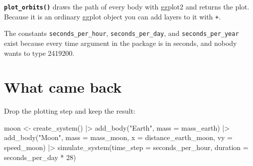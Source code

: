 \documentclass[
  10.5pt,
  letterpaper,
]{scrbook}
\newenvironment{Shaded}{\begin{snugshade}}{\end{snugshade}}
\newcommand{\AttributeTok}[1]{\textcolor[rgb]{0.00,0.00,0.00}{#1}}
\newcommand{\DecValTok}[1]{\textcolor[rgb]{0.00,0.00,0.00}{#1}}
\newcommand{\FunctionTok}[1]{\textcolor[rgb]{0.00,0.00,0.00}{#1}}
\newcommand{\NormalTok}[1]{\textcolor[rgb]{0.00,0.00,0.00}{#1}}
\newcommand{\OtherTok}[1]{\textcolor[rgb]{0.00,0.00,0.00}{#1}}
\newcommand{\SpecialCharTok}[1]{\textcolor[rgb]{0.00,0.00,0.00}{#1}}
\newcommand{\StringTok}[1]{\textcolor[rgb]{0.00,0.00,0.00}{#1}}
\theoremstyle{definition}
\theoremstyle{plain}
\theoremstyle{remark}
\begin{document}
\textbf{\texttt{plot\_orbits()}} draws the path of every body with
ggplot2 and returns the plot. Because it is an ordinary ggplot object
you can add layers to it with \texttt{+}.

The constants \texttt{seconds\_per\_hour}, \texttt{seconds\_per\_day},
and \texttt{seconds\_per\_year} exist because every time argument in the
package is in seconds, and nobody wants to type 2419200.

\section{What came back}\label{what-came-back}

Drop the plotting step and keep the result:

\begin{Shaded}
\begin{Highlighting}[]
\NormalTok{moon }\OtherTok{\textless{}{-}} \FunctionTok{create\_system}\NormalTok{() }\SpecialCharTok{|\textgreater{}}
  \FunctionTok{add\_body}\NormalTok{(}\StringTok{"Earth"}\NormalTok{, }\AttributeTok{mass =}\NormalTok{ mass\_earth) }\SpecialCharTok{|\textgreater{}}
  \FunctionTok{add\_body}\NormalTok{(}\StringTok{"Moon"}\NormalTok{, }\AttributeTok{mass =}\NormalTok{ mass\_moon, }\AttributeTok{x =}\NormalTok{ distance\_earth\_moon, }\AttributeTok{vy =}\NormalTok{ speed\_moon) }\SpecialCharTok{|\textgreater{}}
  \FunctionTok{simulate\_system}\NormalTok{(}\AttributeTok{time\_step =}\NormalTok{ seconds\_per\_hour, }\AttributeTok{duration =}\NormalTok{ seconds\_per\_day }\SpecialCharTok{*} \DecValTok{28}\NormalTok{)}


\end{Highlighting}
\end{Shaded}
\end{document}
